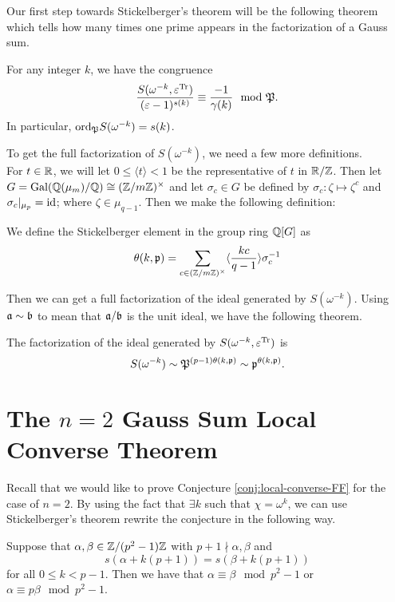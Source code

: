 Our first step towards Stickelberger's theorem will be the following theorem which tells how many times one prime appears in the factorization of a Gauss sum.
\begin{theorem}\label{thm:Stickelberger}
For any integer $k$, we have the congruence 
\[\frac{S(\omega^{-k}, \varepsilon^{\textrm{Tr}})}{(\varepsilon - 1)^{s(k)}} \equiv \frac{-1}{\gamma(k)} \mod {\mathfrak{P}}.\]
In particular, $\textrm{ord}_{\mathfrak{P}} S(\omega^{-k}) = s(k)$.
\end{theorem}
To get the full factorization of $S(\omega^{-k})$, we need a few more definitions.\\

For $t \in \mathbb{R}$, we will let $0 \leq \langle t \rangle < 1$ be the representative of $t$ in $ \mathbb{R} / \mathbb{Z}$. 
Then let $G = \textrm{Gal}(\mathbb{Q}(\mu_m)/\mathbb{Q}) \cong (\mathbb{Z} / m\mathbb{Z})^\times$ and let $\sigma_c \in G$ be defined by $\sigma_c : \zeta \mapsto \zeta^c$ and $\sigma_c|_{\mu_p}  = \textrm{id}$; where $\zeta \in \mu_{q-1}$.
Then we make the following definition: 
\begin{defn}
We define the Stickelberger element in the group ring $\mathbb{Q}[G]$ as 
\[\theta(k,\mathfrak{p}) = \sum_{c \in (\mathbb{Z}/m\mathbb{Z})^\times} \langle \frac{kc}{q-1}\rangle \sigma_c^{-1}\]
\end{defn}
Then we can get a full factorization of the ideal generated by $S(\omega^{-k})$. Using $\mathfrak{a} \sim \mathfrak{b}$ to mean that $\mathfrak{a} / \mathfrak{b}$ is the unit ideal, we have the following theorem.
\begin{theorem}
The factorization of the ideal generated by $S(\omega^{-k}, \varepsilon^{\textrm{Tr}})$ is \[S(\omega^{-k}) \sim \mathfrak{P}^{(p-1)\theta(k, \mathfrak{p})} \sim \mathfrak{p}^{\theta(k,\mathfrak{p})}.\]
\end{theorem}



\section{The $n=2$ Gauss Sum Local Converse Theorem}
\label{sec:n=2-LCT-FF}

Recall that we would like to prove Conjecture \ref{conj:local-converse-FF} for the case of $n=2$.
By using the fact that $\exists k$ such that $\chi = \omega^k$, we can use Stickelberger's theorem rewrite the conjecture in the following way.

\begin{theorem}\label{thm:local-converse-FF-rewrite}
Suppose that $\alpha, \beta \in \mathbb{Z}/(p^2 -1)\mathbb{Z}$ with $p+1 \nmid \alpha, \beta$ and \[s(\alpha + k(p+1)) = s(\beta + k(p+1))\] for all $0 \leq k < p-1$. Then we have that $\alpha \equiv \beta \mod p^2 - 1$ or $\alpha \equiv p \beta \mod p^2 -1$.
\end{theorem}

